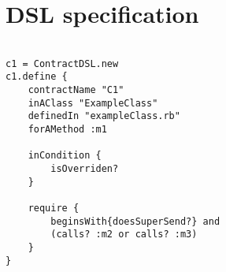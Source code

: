 \section{DSL specification}
\lstset{
	language=Ruby,        %
	tabsize=3,
	basicstyle = \small \ttfamily,
	basewidth=0.5em
}
\begin{lstlisting}[frame=single]  % Start your code-block

c1 = ContractDSL.new
c1.define {
    contractName "C1"
    inAClass "ExampleClass"
    definedIn "exampleClass.rb"
    forAMethod :m1
    
    inCondition { 
        isOverriden?
    }
    
    require {
    	beginsWith{doesSuperSend?} and
		(calls? :m2 or calls? :m3)
    }
}
\end{lstlisting}